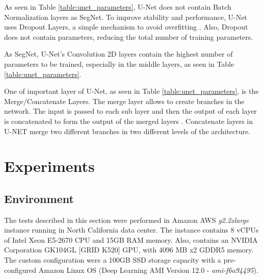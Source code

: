 \documentclass[10pt,twocolumn,letterpaper]{article}
\begin{document}
As seen in Table \ref{table:unet_parameters}, U-Net does not contain Batch Normalization layers as SegNet. To improve stability and performance, U-Net uses Dropout Layers, a simple mechanism to avoid overfitting \cite{DROPOUT}. Also, Dropout does not contain parameters, reducing the total number of training parameters.

As SegNet, U-Net's Convolution 2D layers contain the highest number of parameters to be trained, especially in the middle layers, as seen in Table \ref{table:unet_parameters}.

One of important layer of U-Net, as seen in Table \ref{table:unet_parameters}, is the Merge/Concatenate Layers. The merge layer allows to create branches in the network. The input is passed to each sub layer and then the output of each layer is concatenated to form the output of the merged layers \cite{MERGE_WEBSITE}. Concatenate layers in U-NET merge two different branches in two different levels of the architecture.

\section{Experiments} \label{sec:experiments}


\subsection{Environment} \label{ssec:environment}

The tests described in this section were performed in Amazon AWS \cite{AMAZON_WEBSITE} \textit{g2.2xlarge} instance running in North California data center. The instance contains 8 vCPUs of Intel Xeon E5-2670 CPU and 15GB RAM memory. Also, contains an NVIDIA Corporation GK104GL [GRID K520] GPU, with 4096 MB x2 GDDR5 memory. The custom configuration were a 100GB SSD storage capacity with a pre-configured Amazon Linux OS (Deep Learning AMI Version 12.0 - \textit{ami-f6a94495}).
\end{document}
